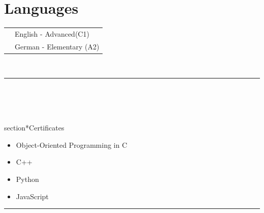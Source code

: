 \documentclass[oneside]{article}
\begin{document}
{\begin{minipage}[t][\textheight-2\fboxsep-2\fboxrule][t]{\dimexpr0.40\textwidth-2\fboxrule-2\fboxsep\relax}
        \section*{\large Languages}
        \begin{tabular}{cl}
            \faLanguage{} & English - Advanced(C1) \\
            \faLanguage{} & German - Elementary (A2) 
        \end{tabular}
        \vspace{.3cm}
        \\
        \rule{\linewidth}{0.4pt}
        \\%
{}   \\
\\section*{\large Certificates}

\begin{itemize}
    \setlength{\itemsep}{-2pt}

    \item Object-Oriented Programming in C
    \item C++
    \item Python
    \item JavaScript

\end{itemize}

\vspace{0cm}
\rule{\linewidth}{0.4pt}

        
        \vfill
       
    \end{minipage}
}
\hfill
\end{document}
